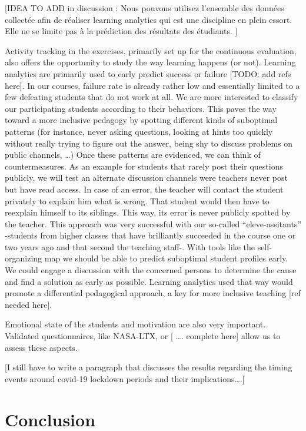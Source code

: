 \documentclass{aims}
\theoremstyle{definition}
\begin{document}
{[}IDEA TO ADD in discussion : Nous pouvons utilisez l'ensemble des
données collectée afin de réaliser learning analytics qui est une
discipline en plein essort. Elle ne se limite pas à la prédiction des
résultats des étudiants. \cite{Siemens2013} {]}

Activity tracking in the exercises, primarily set up for the continuous
evaluation, also offers the opportunity to study the way learning
happens (or not). Learning analytics are primarily used to early predict
success or failure {[}TODO: add refs here{]}. In our courses, failure
rate is already rather low and essentially limited to a few defeating
students that do not work at all. We are more interested to classify our
participating students according to their behaviors. This paves the way
toward a more inclusive pedagogy by spotting different kinds of
suboptimal patterns (for instance, never asking questions, looking at
hints too quickly without really trying to figure out the answer, being
shy to discuss problems on public channels, \ldots) Once these patterns
are evidenced, we can think of countermeasures. As an example for
students that rarely post their questions publicly, we will test an
alternate discussion channels were teachers never post but have read
access. In case of an error, the teacher will contact the student
privately to explain him what is wrong. That student would then have to
reexplain himself to its siblings. This way, its error is never publicly
spotted by the teacher. This approach was very successful with our
so-called ``eleve-assitants'' -students from higher classes that have
brilliantly succeeded in the course one or two years ago and that second
the teaching staff-. With tools like the self-organizing map we should
be able to predict suboptimal student profiles early. We could engage a
discussion with the concerned persons to determine the cause and find a
solution as early as possible. Learning analytics used that way would
promote a differential pedagogical approach, a key for more inclusive
teaching {[}ref needed here{]}.

Emotional state of the students and motivation are also very important.
Validated questionnaires, like NASA-LTX, or {[} \ldots. complete here{]}
allow us to assess these aspects.

{[}I still have to write a paragraph that discusses the results
regarding the timing events around covid-19 lockdown periods and their
implications\ldots.{]}

\hypertarget{conclusion}{%
\section{Conclusion}\label{conclusion}}
\end{document}
